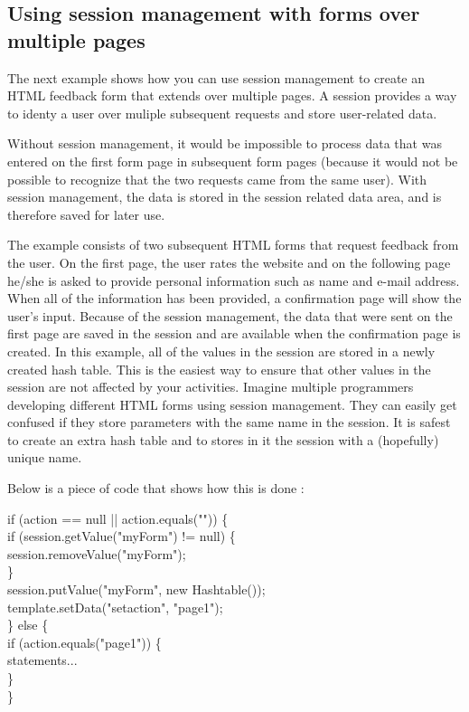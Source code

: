 \subsection{Using session management with forms over multiple pages}

The next example shows how you can use session management to create an
HTML feedback form that extends over multiple pages. A session provides
a way to identy a user over muliple subsequent requests and store user-related data.

Without session management, it would be impossible to
process data that was entered on the first form page in subsequent form
pages (because it would not be possible to recognize that the two requests came
from the same user). With session management, the data is stored in the session
related data area, and is therefore saved for later use.

The example consists of two subsequent HTML forms that request feedback
from the user. On the first page, the user rates the website and on the
following page he/she is asked to provide personal information such as
name and e-mail address. When all of the information has been provided,
a confirmation page will show the user's input. Because of
the session management, the data that were sent on the first page are
saved in the session and are available when the confirmation page is created.
In this example, all of the values in the session are
stored in a newly created hash table. This is the easiest way to ensure
that other values in the session are not affected by your activities. 
Imagine multiple programmers developing different HTML forms
using session management. They can easily get confused if they store
parameters with the same name in the session. It is safest to create an
extra hash table and to stores in it the session with a
(hopefully) unique name.

Below is a piece of code that shows how this is done :

\begin{java}
if (action == null || action.equals("")) \{\\
\jtaba    if (session.getValue("myForm") != null) \{\\
\jtabb        session.removeValue("myForm");\\
\jtaba    \}\\
\jtaba    session.putValue("myForm", new Hashtable());\\
\jtaba    template.setData("setaction", "page1");\\
\} else \{\\
\jtaba    if (action.equals("page1")) \{\\
\jtabb        statements...\\
\jtaba    \}\\
\}\\
\end{java}

